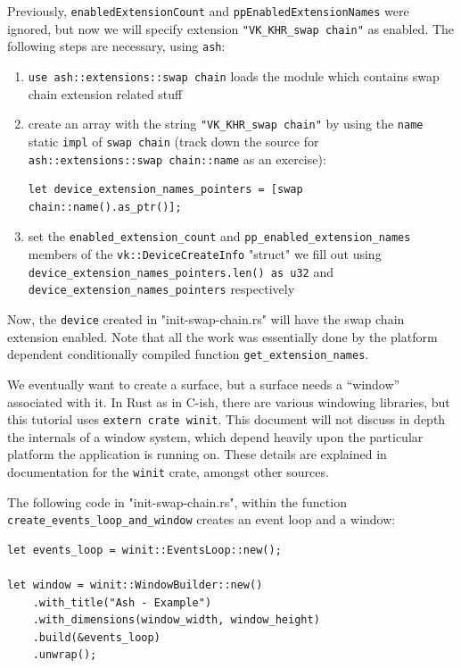 \documentclass[12pt,letterpaper]{article}
\newcommand{\inquotes}[1]{``#1''}	%
\newcommand{\ril}[1]{\texttt{#1}}
\newcommand{\cil}[1]{\texttt{#1}}
\newcommand{\ash}{\texttt{ash}}
\begin{document}
	Previously, \cil{enabledExtensionCount} and \cil{ppEnabledExtensionNames} were ignored, but now we will specify extension \texttt{"VK\_KHR\_swap chain"} as enabled. The following steps are necessary, using \ash:
		\begin{enumerate}
			\item \ril{use ash::extensions::swap chain} loads the module which contains swap chain extension related stuff
				
			\item create an array with the string \texttt{"VK\_KHR\_swap chain"} by using the \ril{name} static \ril{impl} of \ril{swap chain} (track down the source for \ril{ash::extensions::swap chain::name} as an exercise): 
\begin{verbatim}
let device_extension_names_pointers = [swap chain::name().as_ptr()];
\end{verbatim}
			
			\item set the \ril{enabled_extension_count} and \ril{pp_enabled_extension_names} members of the \ril{vk::DeviceCreateInfo} "struct" we fill out using \ril{device_extension_names_pointers.len() as u32} and \ril{device_extension_names_pointers} respectively
		\end{enumerate}
	
	Now, the \ril{device} created in "init-swap-chain.rs" will have the swap chain extension enabled. Note that all the work was essentially done by the platform dependent conditionally compiled function \ril{get_extension_names}. 
	
    We eventually want to create a surface, but a surface needs a \inquotes{window} associated with it. In Rust as in C-ish, there are various windowing libraries, but this tutorial uses \ril{extern crate winit}. This document will not discuss in depth the internals of a window system, which depend heavily upon the particular platform the application is running on. These details are explained in documentation for the \ril{winit} crate, amongst other sources.
    
    The following code in "init-swap-chain.rs", within the function \ril{create_events_loop_and_window} creates an event loop and a window:
    \begin{verbatim}
let events_loop = winit::EventsLoop::new();

let window = winit::WindowBuilder::new()
    .with_title("Ash - Example")
    .with_dimensions(window_width, window_height)
    .build(&events_loop)
    .unwrap();
    \end{verbatim}
    
\end{document}
